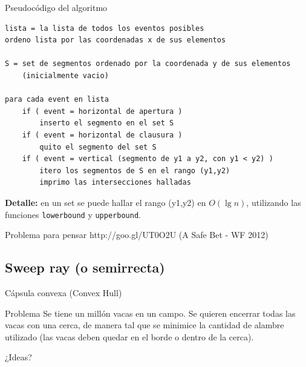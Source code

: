 \documentclass[compress]{beamer}
\newcommand{\bigpause}{\bigskip \pause}
\begin{document}
\begin{frame}[fragile]{Pseudoc\'odigo del algoritmo}

\begin{lstlisting}
lista = la lista de todos los eventos posibles
ordeno lista por las coordenadas x de sus elementos

S = set de segmentos ordenado por la coordenada y de sus elementos
    (inicialmente vacio)

para cada event en lista
    if ( event = horizontal de apertura )
        inserto el segmento en el set S
    if ( event = horizontal de clausura )
        quito el segmento del set S
    if ( event = vertical (segmento de y1 a y2, con y1 < y2) )
        itero los segmentos de S en el rango (y1,y2)
        imprimo las intersecciones halladas

\end{lstlisting}

\textbf{Detalle:} en un set se puede hallar el rango (y1,y2) en $O(\lg n)$,
utilizando las funciones \texttt{lowerbound} y \texttt{upperbound}.

\end{frame}

\begin{frame}{Problema para pensar}
http://goo.gl/UT0O2U (A Safe Bet - WF 2012)
\end{frame}


\subsection{Sweep ray (o semirrecta)}
\begin{frame}{C\'apsula convexa (Convex Hull)}
\begin{block}{Problema}
Se tiene un mill\'on vacas en un campo. Se quieren encerrar todas las vacas con una cerca, de manera tal que se minimice la cantidad de alambre utilizado (las vacas deben quedar en el borde o dentro de la cerca).
\end{block}

¿Ideas? \bigpause

\end{frame}
\end{document}
